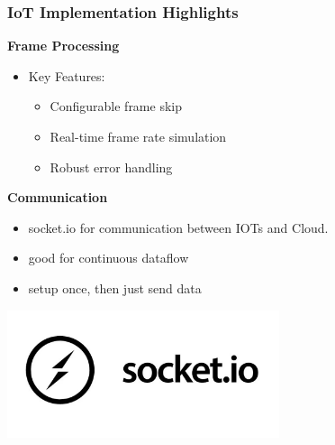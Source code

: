\documentclass{beamer}
\begin{document}
\begin{frame}
\frametitle{IoT Implementation Highlights}
\textbf{Frame Processing}
\begin{itemize}
    \item Key Features:
    \begin{itemize}
    \item Configurable frame skip
    \item Real-time frame rate simulation
    \item Robust error handling
    \end{itemize}
    \end{itemize}

\textbf{Communication}
\begin{itemize}
    \item socket.io for communication between IOTs and Cloud.
    \item good for continuous dataflow
    \item setup once, then just send data
\end{itemize}
\begin{center}
    \includegraphics[width=0.6\textwidth]{./res/socket-io-logo-1.jpeg}
\end{center}

\end{frame}
\end{document}
